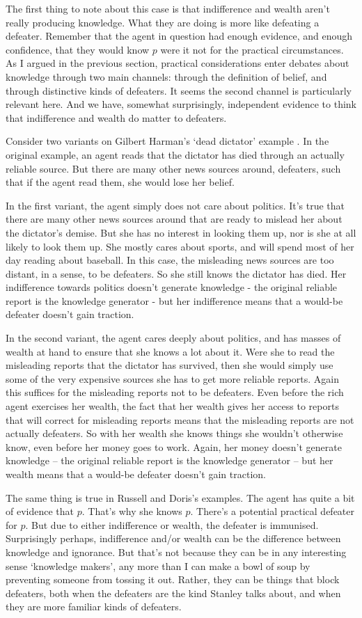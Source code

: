 The first thing to note about this case is that indifference and wealth aren't really producing knowledge. What they are doing is more like defeating a defeater. Remember that the agent in question had enough evidence, and enough confidence, that they would know \(p\) were it not for the practical circumstances. As I argued in the previous section,  practical considerations enter debates about knowledge through two main channels: through the definition of belief, and through distinctive kinds of defeaters. It seems the second channel is particularly relevant here. And we have, somewhat surprisingly, independent evidence to think that indifference and wealth do matter to defeaters.

Consider two variants on Gilbert Harman's `dead dictator' example \citep[75]{Harman1973}. In the original example, an agent reads that the dictator has died through an actually reliable source. But there are many other news sources around, defeaters, such that if the agent read them, she would lose her belief. 

In the first variant, the agent simply does not care about politics. It's true that there are many other news sources around that are ready to mislead her about the dictator's demise. But she has no interest in looking them up, nor is she at all likely to look them up. She mostly cares about sports, and will spend most of her day reading about baseball. In this case, the misleading news sources are too distant, in a sense, to be defeaters. So she still knows the dictator has died. Her indifference towards politics doesn't generate knowledge - the original reliable report is the knowledge generator - but her indifference means that a would-be defeater doesn't gain traction.

In the second variant, the agent cares deeply about politics, and has masses of wealth at hand to ensure that she knows a lot about it. Were she to read the misleading reports that the dictator has survived, then she would simply use some of the very expensive sources she has to get more reliable reports. Again this suffices for the misleading reports not to be defeaters. Even before the rich agent exercises her wealth, the fact that her wealth gives her access to reports that will correct for misleading reports means that the misleading reports are not actually defeaters. So with her wealth she knows things she wouldn't otherwise know, even before her money goes to work. Again, her money doesn't generate knowledge -- the original reliable report is the knowledge generator -- but her wealth means that a would-be defeater doesn't gain traction.

The same thing is true in Russell and Doris's examples. The agent has quite a bit of evidence that \(p\). That's why she knows \(p\). There's a potential practical defeater for \(p\). But due to either indifference or wealth, the defeater is immunised. Surprisingly perhaps, indifference and/or wealth can be the difference between knowledge and ignorance. But that's not because they can be in any interesting sense `knowledge makers', any more than I can make a bowl of soup by preventing someone from tossing it out. Rather, they can be things that block defeaters, both when the defeaters are the kind Stanley talks about, and when they are more familiar kinds of defeaters.